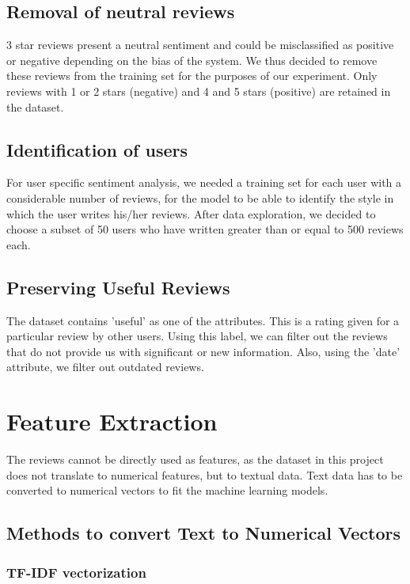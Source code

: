 \documentclass[letterpaper, 10 pt, conference]{ieeeconf}  %
\begin{document}
\subsection{Removal of neutral reviews}

3 star reviews present a neutral sentiment and could be misclassified as positive or negative depending on the bias of the system. We thus decided to remove these reviews from the training set for the purposes of our experiment. Only reviews with 1 or 2 stars (negative) and 4 and 5 stars (positive) are retained in the dataset.

\subsection{Identification of users}

For user specific sentiment analysis, we needed a training set for each user with a considerable number of reviews, for the model to be able to identify the style in which the user writes his/her reviews. After data exploration, we decided to choose a subset of 50 users who have written greater than or equal to 500 reviews each.

\subsection{Preserving Useful Reviews}

The dataset contains 'useful' as one of the attributes. This is a rating given for a particular review by other users. Using this label, we can filter out the reviews that do not provide us with significant or new information. Also, using the 'date' attribute, we filter out outdated reviews.

\section{Feature Extraction}

The reviews cannot be directly used as features, as the dataset in this project does not translate to numerical features, but to textual data. Text data has to be converted to numerical vectors to fit the machine learning models.

\subsection{Methods to convert Text to Numerical Vectors}

\subsubsection{TF-IDF vectorization}
\end{document}
